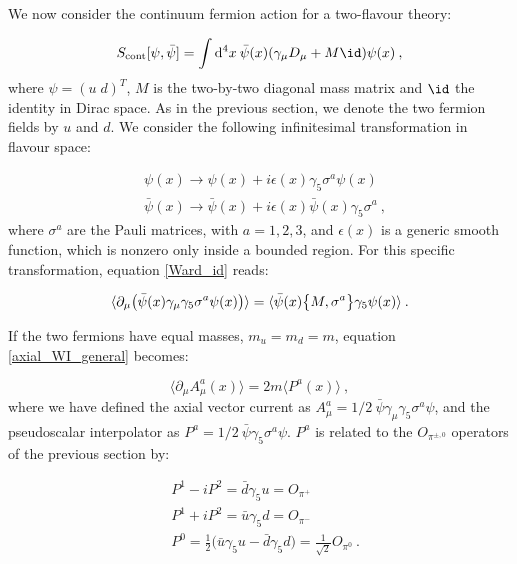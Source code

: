 We now consider the continuum fermion action for a two-flavour theory:

\begin{equation}
S_{\mathrm{cont}}[\psi, \bar \psi] =  \int \dx  \: \bar \psi(x)(\gamma_{\mu} D_{\mu} + M \id) \psi(x) \: ,
\end{equation}
%
where $\psi = (u \; d)^T$, $M$ is the two-by-two diagonal mass matrix and $\id$ the identity in Dirac space. As in the previous section, we denote the two fermion fields by $u$ and $d$. We consider the following infinitesimal transformation in flavour space:

\begin{equation}
\begin{split}
& \psi(x) \to \psi(x) + i \epsilon(x) \gamma_5 \sigma^a \psi(x) \\
& \bar\psi(x) \to \bar\psi(x) + i \epsilon(x) \bar \psi(x) \gamma_5 \sigma^a \: ,
\end{split}
\end{equation}
%
where $\sigma^a$ are the Pauli matrices, with $a=1,2,3$, and $\epsilon(x)$ is a generic smooth function, which is nonzero only inside a bounded region. For this specific transformation, equation \ref{Ward_id} reads:

\begin{equation}
\langle \partial_{\mu} \bigl(\bar \psi(x) \gamma_{\mu} \gamma_5 \sigma^a \psi(x)\bigr) \rangle = \langle \bar\psi(x) \qty \big{M,\sigma^a} \gamma_5 \psi(x) \rangle \: .
\label{axial_WI_general}
\end{equation}

If the two fermions have equal masses, $m_u = m_d = m$, equation \ref{axial_WI_general} becomes:

\begin{equation}
\langle \partial_{\mu} A^a_{\mu} (x) \rangle = 2 m \langle P^a(x) \rangle \: ,
\label{PCAC}
\end{equation}
%
where we have defined the axial vector current as $A^a_{\mu} = 1/2 \: \bar \psi \gamma_{\mu} \gamma_5 \sigma^a \psi$, and the pseudoscalar interpolator as $P^a = 1/2 \: \bar\psi \gamma_5 \sigma^a \psi$. $P^a$ is related to the $O_{\pi^{\pm,0}}$ operators of the previous section by:

\begin{equation}
\begin{split}
& P^1 - iP^2 = \bar d \gamma_5 u = O_{\pi^+} \\
& P^1 + iP^2 = \bar u \gamma_5 d = O_{\pi^-} \\
& P^0 = \frac{1}{2} \bigl( \bar u \gamma_5 u - \bar d \gamma_5 d \bigr) = \frac{1}{\sqrt 2} O_{\pi^0} \: .
\end{split}
\end{equation}

